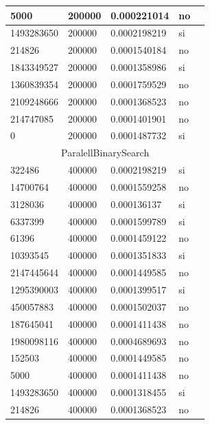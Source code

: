\documentclass[12pt, fleqn]{article}                             %
\theoremstyle{break}                                            %
\begin{document}
\begin{longtable}{|m{5em}|m{5em}|m{10em}|m{5em}|@{}m{0pt}@{}}
            5000& 200000  & 0.000221014 & no &\\[1em]    \hline
            1493283650& 200000  & 0.0002198219 & si &\\[1em]    \hline
            214826& 200000  & 0.0001540184 & no &\\[1em]    \hline
            1843349527& 200000  & 0.0001358986 & si &\\[1em]    \hline
            1360839354& 200000  & 0.0001759529 & no &\\[1em]    \hline
            2109248666& 200000  & 0.0001368523 & no &\\[1em]    \hline
            214747085& 200000  & 0.0001401901 & no &\\[1em]    \hline
            0& 200000  & 0.0001487732 & si &\\[1em]    \hline
            \multicolumn{5}{|c|}{ParalellBinarySearch}   \\          \hline
            322486& 400000  & 0.0002198219 & si &\\[1em]    \hline
            14700764& 400000  & 0.0001559258 & no &\\[1em]    \hline
            3128036& 400000  & 0.000136137 & si &\\[1em]    \hline
            6337399& 400000  & 0.0001599789 & si &\\[1em]    \hline
            61396& 400000  & 0.0001459122 & no &\\[1em]    \hline
            10393545& 400000  & 0.0001351833 & si &\\[1em]    \hline
            2147445644& 400000  & 0.0001449585 & no &\\[1em]    \hline
            1295390003& 400000  & 0.0001399517 & si &\\[1em]    \hline
            450057883& 400000  & 0.0001502037 & no &\\[1em]    \hline
            187645041& 400000  & 0.0001411438 & no &\\[1em]    \hline
            1980098116& 400000  & 0.0004689693 & no &\\[1em]    \hline
            152503& 400000  & 0.0001449585 & no &\\[1em]    \hline
            5000& 400000  & 0.0001411438 & no &\\[1em]    \hline
            1493283650& 400000  & 0.0001318455 & si &\\[1em]    \hline
            214826& 400000  & 0.0001368523 & no &\\[1em]    \hline

\end{longtable}
\end{document}
